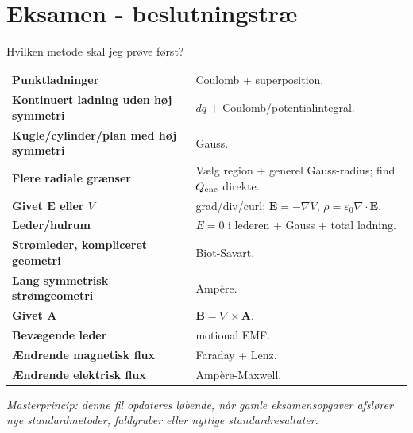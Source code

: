 \documentclass[10pt,a4paper]{article}
\newcommand{\epsz}{\varepsilon_0}
\begin{document}
\section{Eksamen - beslutningstræ}
\begin{quickbox}{Hvilken metode skal jeg prøve først?}
\begin{tabularx}{\textwidth}{>{\bfseries}p{4.0cm}X}
Punktladninger & Coulomb + superposition.\\
Kontinuert ladning uden høj symmetri & $dq$ + Coulomb/potentialintegral.\\
Kugle/cylinder/plan med høj symmetri & Gauss.\\
Flere radiale grænser & Vælg region + generel Gauss-radius; find $Q_{\rm enc}$ direkte.\\
Givet $\mathbf E$ eller $V$ & grad/div/curl; $\mathbf E=-\nabla V$, $\rho=\epsz\nabla\cdot\mathbf E$.\\
Leder/hulrum & $E=0$ i lederen + Gauss + total ladning.\\
Strømleder, kompliceret geometri & Biot-Savart.\\
Lang symmetrisk strømgeometri & Ampère.\\
Givet $\mathbf A$ & $\mathbf B=\nabla\times\mathbf A$.\\
Bevægende leder & motional EMF.\\
Ændrende magnetisk flux & Faraday + Lenz.\\
Ændrende elektrisk flux & Ampère-Maxwell.\\
\end{tabularx}
\end{quickbox}

\vfill
\small\textit{Masterprincip: denne fil opdateres løbende, når gamle eksamensopgaver afslører nye standardmetoder, faldgruber eller nyttige standardresultater.}
\end{document}
